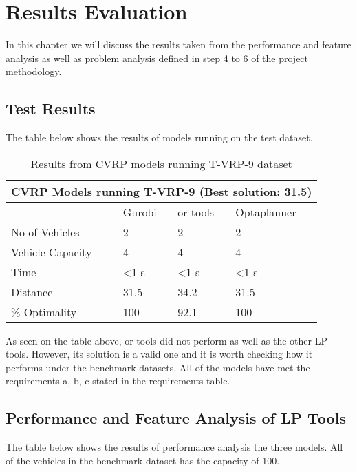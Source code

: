\chapter{Results Evaluation}
In this chapter we will discuss the results taken from the performance and feature analysis as well as problem analysis
defined in step 4 to 6 of the project methodology.

\section{Test Results}
The table below shows the results of models running on the test dataset.

\begin{table}[!ht]
\centering
\begin{tabular}{|l|l|l|l|}
\hline
\multicolumn{4}{|c|}{CVRP Models running T-VRP-9 (Best solution: 31.5)} \\ \hline
              & Gurobi         & or-tools       & Optaplanner    \\ \hline
No of Vehicles & 2               & 2              & 2             \\ \hline
Vehicle Capacity & 4               & 4              & 4             \\ \hline
Time          & \textless 1 s  & \textless 1 s  & \textless 1 s  \\ \hline
Distance      & 31.5           & 34.2           & 31.5           \\ \hline
\% Optimality & 100            & 92.1           & 100          \\ \hline
\end{tabular}
\caption{Results from CVRP models running T-VRP-9 dataset}
\label{test-table}
\end{table}

As seen on the table above, or-tools did not perform as well as the other LP tools. However, its solution is a valid one
and it is worth checking how it performs under the benchmark datasets. All of the models have met the requirements a, b, c
stated in the requirements table.

\section{Performance and Feature Analysis of LP Tools}
The table below shows the results of performance analysis the three models. All of the vehicles in the benchmark dataset
has the capacity of 100.

